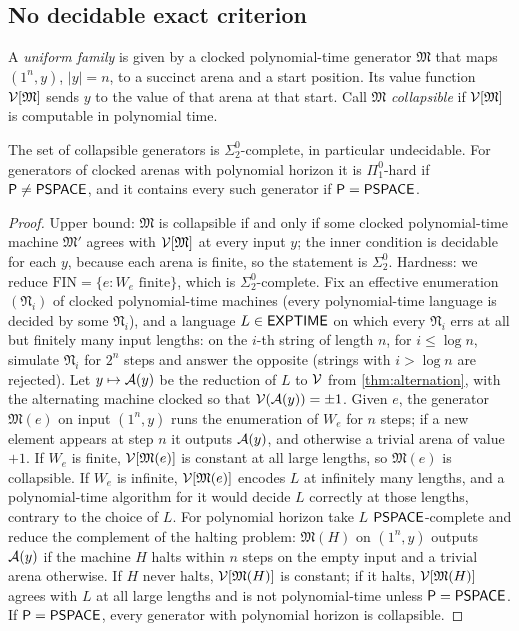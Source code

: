 \subsection{No decidable exact criterion}
A \emph{uniform family} is given by a clocked polynomial-time generator $\mathfrak M$ that maps $(1^n,y)$, $|y|=n$, to a succinct arena and a start position. Its value function $\mathcal{V}[\mathfrak M]$ sends $y$ to the value of that arena at that start. Call $\mathfrak M$ \emph{collapsible} if $\mathcal{V}[\mathfrak M]$ is computable in polynomial time.

\begin{theorem}\label{thm:sigma2}
The set of collapsible generators is $\Sigma^0_2$-complete, in particular undecidable. For generators of clocked arenas with polynomial horizon it is $\Pi^0_1$-hard if $\mathsf{P}\ne\mathsf{PSPACE}$, and it contains every such generator if $\mathsf{P}=\mathsf{PSPACE}$.
\end{theorem}
\begin{proof}
Upper bound: $\mathfrak M$ is collapsible if and only if some clocked polynomial-time machine $\mathfrak M'$ agrees with $\mathcal{V}[\mathfrak M]$ at every input $y$; the inner condition is decidable for each $y$, because each arena is finite, so the statement is $\Sigma^0_2$.
Hardness: we reduce $\mathrm{FIN}=\{e:W_e\text{ finite}\}$, which is $\Sigma^0_2$-complete. Fix an effective enumeration $(\mathfrak N_i)$ of clocked polynomial-time machines (every polynomial-time language is decided by some $\mathfrak N_i$), and a language $L\in\mathsf{EXPTIME}$ on which every $\mathfrak N_i$ errs at all but finitely many input lengths: on the $i$-th string of length $n$, for $i\le\log n$, simulate $\mathfrak N_i$ for $2^n$ steps and answer the opposite (strings with $i>\log n$ are rejected). Let $y\mapsto\mathcal{A}(y)$ be the reduction of $L$ to $\mathcal{V}$ from \cref{thm:alternation}, with the alternating machine clocked so that $\mathcal{V}(\mathcal{A}(y))=\pm1$. Given $e$, the generator $\mathfrak M(e)$ on input $(1^n,y)$ runs the enumeration of $W_e$ for $n$ steps; if a new element appears at step $n$ it outputs $\mathcal{A}(y)$, and otherwise a trivial arena of value $+1$. If $W_e$ is finite, $\mathcal{V}[\mathfrak M(e)]$ is constant at all large lengths, so $\mathfrak M(e)$ is collapsible. If $W_e$ is infinite, $\mathcal{V}[\mathfrak M(e)]$ encodes $L$ at infinitely many lengths, and a polynomial-time algorithm for it would decide $L$ correctly at those lengths, contrary to the choice of $L$.
For polynomial horizon take $L$ $\mathsf{PSPACE}$-complete and reduce the complement of the halting problem: $\mathfrak M(H)$ on $(1^n,y)$ outputs $\mathcal{A}(y)$ if the machine $H$ halts within $n$ steps on the empty input and a trivial arena otherwise. If $H$ never halts, $\mathcal{V}[\mathfrak M(H)]$ is constant; if it halts, $\mathcal{V}[\mathfrak M(H)]$ agrees with $L$ at all large lengths and is not polynomial-time unless $\mathsf{P}=\mathsf{PSPACE}$. If $\mathsf{P}=\mathsf{PSPACE}$, every generator with polynomial horizon is collapsible.
\end{proof}

